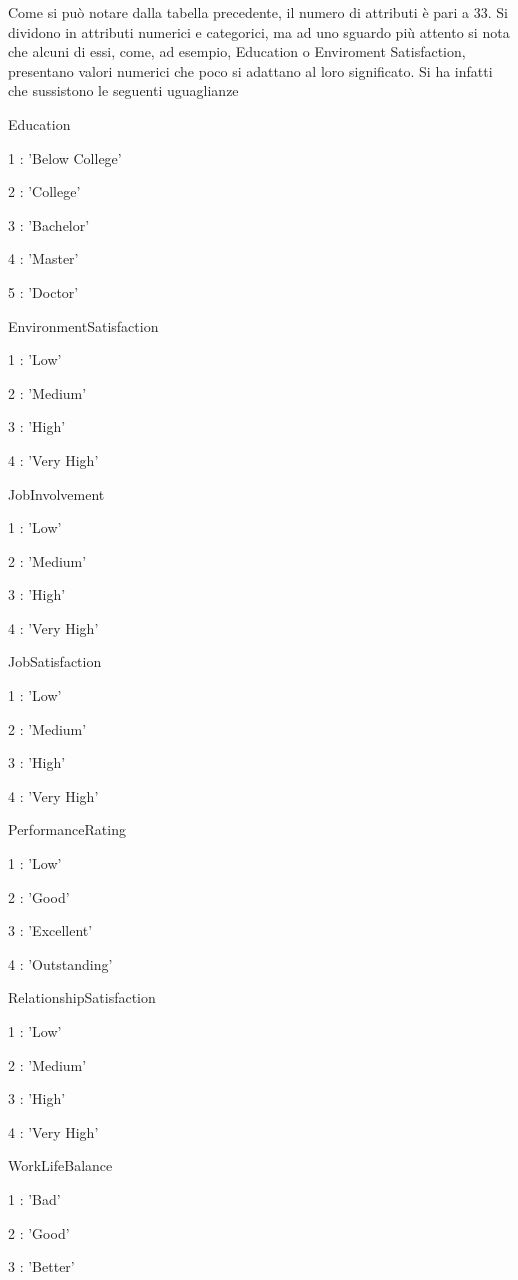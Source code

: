\documentclass[english]{article}
\begin{document}
Come si può notare dalla tabella precedente, il numero di attributi è pari a 33. Si dividono in attributi numerici e categorici, ma ad uno sguardo più attento si nota che alcuni di essi, come, ad esempio, Education o Enviroment Satisfaction, presentano valori numerici che poco si adattano al loro significato. Si ha infatti che sussistono le seguenti uguaglianze 

Education

1 : 'Below College'

2 : 'College'

3 : 'Bachelor'

4 : 'Master'

5 : 'Doctor'


EnvironmentSatisfaction

1 : 'Low'

2 : 'Medium'

3 : 'High'

4 : 'Very High'


JobInvolvement

1 : 'Low'

2 : 'Medium'

3 : 'High'

4 : 'Very High'

JobSatisfaction

1 : 'Low'

2 : 'Medium'

3 : 'High'

4 : 'Very High'


PerformanceRating

1 : 'Low'

2 : 'Good'

3 : 'Excellent'

4 : 'Outstanding'


RelationshipSatisfaction

1 : 'Low'

2 : 'Medium'

3 : 'High'

4 : 'Very High'


WorkLifeBalance

1 : 'Bad'

2 : 'Good'

3 : 'Better'
\end{document}
